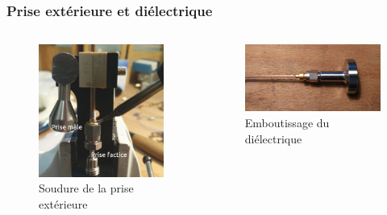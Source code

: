 \documentclass[10pt,a9paper,handout]{beamer} \usepackage[utf8]{inputenc} \usepackage[francais]{babel} \usepackage[T1]{fontenc}
\begin{document}
\begin{frame}
\frametitle{Prise extérieure et diélectrique}
\begin{columns}

\begin{column}{0.5\textwidth}
\begin{figure}[h]
    \begin{center}
        \includegraphics[width=\textwidth]{Images/Coax/4}
        \caption{Soudure de la prise extérieure}
    \end{center}
\end{figure}
\end{column}
\begin{column}{0.5\textwidth}
\begin{figure}[h]
    \begin{center}
        \includegraphics[width=\textwidth]{Images/Coax/6}
        \caption{Emboutissage du diélectrique}
    \end{center}
\end{figure}
\end{column}
\end{columns}
\end{frame}
\end{document}
